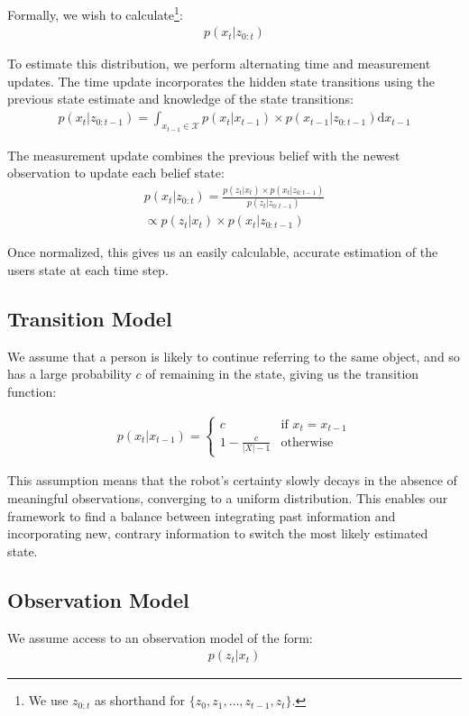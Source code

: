 \documentclass[a4paper, 11pt]{article} %
\begin{document}
Formally, we wish to calculate\footnote{We use $z_{0:t}$ as shorthand for $\{z_0, z_1, \dots, z_{t-1}, z_t\}$.}:
\begin{align}
p(x_t | z_{0:t})
\end{align}

To estimate this distribution, we perform alternating time and measurement updates. The time update incorporates the hidden state transitions using the previous state estimate and knowledge of the state transitions:
\begin{align}
p(x_t | z_{0:t-1}) = \int_{x_{t-1} \in \mathcal{X}} p(x_t|x_{t-1})\times p(x_{t-1} | z_{0:t-1}) \text{d}x_{t-1}
\end{align}

The measurement update combines the previous belief with the newest observation to update each belief state: 
\begin{align}
p(x_t |z_{0:t}) = \frac{p(z_t | x_t) \times p(x_t | z_{0:t-1})}{p(z_t | z_{0:t-1})} \\\propto p(z_t | x_t) \times p(x_t | z_{0:t-1})
\end{align}

Once normalized, this gives us an easily calculable, accurate estimation of the users state at each time step.
\subsection{Transition Model}
We assume that a person is likely to continue referring to the same
object, and so has a large probability $c$ of remaining in the state, giving us the transition function:

\begin{align}
p(x_t | x_{t-1}) = \left\{  \begin{array}{ll}
c&\mbox{if } x_t = x_{t-1}\\
1-\frac{c}{|X|-1}&\mbox{otherwise}
\end{array}\right.
\end{align}

This assumption means that the robot's certainty slowly decays in the absence of meaningful observations, converging to a uniform distribution. This enables our framework to find a balance between integrating past information and incorporating new, contrary information to switch the most likely estimated state.
\subsection{Observation Model}
We assume access to an observation model of the form:
\begin{align}
p(z_t | x_t)
\end{align}
\end{document}
